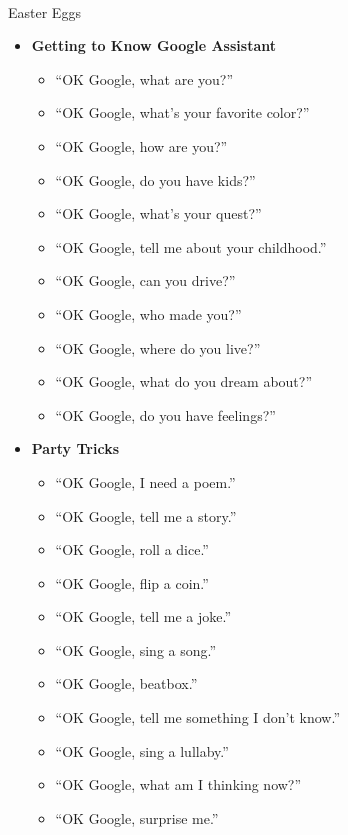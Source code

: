 \documentclass[
  a4paper,
]{article}
\makeatletter
\let\oldparagraph\paragraph
\renewcommand{\paragraph}{
    \@ifstar
      \xxxParagraphStar
      \xxxParagraphNoStar
  }
\newcommand{\xxxParagraphStar}[1]{\oldparagraph*{#1}\mbox{}}
\newcommand{\xxxParagraphNoStar}[1]{\oldparagraph{#1}\mbox{}}
\providecommand{\tightlist}{%
  \setlength{\itemsep}{0pt}\setlength{\parskip}{0pt}}\usepackage{longtable,booktabs,array}
\makeatother
\begin{document}
\paragraph{Easter Eggs}\label{easter-eggs}

\begin{itemize}
\tightlist
\item
  \textbf{Getting to Know Google Assistant}

  \begin{itemize}
  \tightlist
  \item
    ``OK Google, what are you?''
  \item
    ``OK Google, what's your favorite color?''
  \item
    ``OK Google, how are you?''
  \item
    ``OK Google, do you have kids?''
  \item
    ``OK Google, what's your quest?''
  \item
    ``OK Google, tell me about your childhood.''
  \item
    ``OK Google, can you drive?''
  \item
    ``OK Google, who made you?''
  \item
    ``OK Google, where do you live?''
  \item
    ``OK Google, what do you dream about?''
  \item
    ``OK Google, do you have feelings?''
  \end{itemize}
\item
  \textbf{Party Tricks}

  \begin{itemize}
  \tightlist
  \item
    ``OK Google, I need a poem.''
  \item
    ``OK Google, tell me a story.''
  \item
    ``OK Google, roll a dice.''
  \item
    ``OK Google, flip a coin.''
  \item
    ``OK Google, tell me a joke.''
  \item
    ``OK Google, sing a song.''
  \item
    ``OK Google, beatbox.''
  \item
    ``OK Google, tell me something I don't know.''
  \item
    ``OK Google, sing a lullaby.''
  \item
    ``OK Google, what am I thinking now?''
  \item
    ``OK Google, surprise me.''
  \end{itemize}
\end{itemize}
\end{document}
